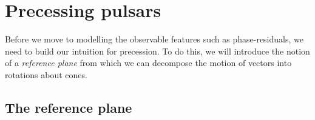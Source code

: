 \documentclass[../full_thesis/full_thesis.tex]{subfiles}
\begin{document}
%




\section{Precessing pulsars}
\label{sec: precessing pulsars}
Before we move to modelling the observable features such as phase-residuals,
we need to build our intuition for precession. To do this, we will introduce
the notion of a \emph{reference plane} from which we can decompose the motion of
vectors into rotations about cones.

\subsection{The reference plane}
\label{sec: reference plane}
\end{document}
